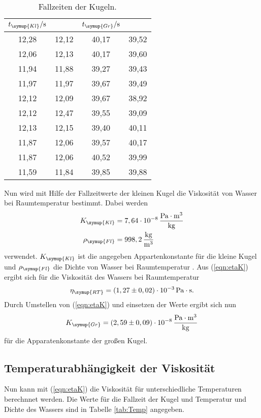 \begin{table}
  \centering
  \caption{Fallzeiten der Kugeln.}
  \label{tab:Fallzeit}
  \begin{tabular}{c c | c c}
    \toprule
    $t_{\symup{Kl}}/\unit{\second} $ & $ $ & $t_{\symup{Gr}}/\unit{\second}$ & $ $ \\
    \midrule
    12,28 & 12,12 & 40,17 & 39,52 \\
    12,06 & 12,13 & 40,17 & 39,60 \\
    11,94 & 11,88 & 39,27 & 39,43 \\
    11,97 & 11,97 & 39,67 & 39,49 \\
    12,12 & 12,09 & 39,67 & 38,92 \\
    12,12 & 12,47 & 39,55 & 39,09 \\
    12,13 & 12,15 & 39,40 & 40,11 \\
    11,87 & 12,06 & 39,57 & 40,17 \\
    11,87 & 12,06 & 40,52 & 39,99 \\
    11,59 & 11,84 & 39,85 & 39,88 \\
    \bottomrule
  \end{tabular}
\end{table}

Nun wird mit Hilfe der Fallzeitwerte der kleinen Kugel die Viskosität von Wasser bei Raumtemperatur bestimmt. Dabei werden
\begin{align*}
  K_{\symup{Kl}} &= 7,64\cdot 10^{-8} \,\frac{\unit{\pascal}\cdot\unit{\meter^3}}{\unit{\kilo\gram}} \\
  \rho_{\symup{Fl}} &= 998,2\,\frac{\unit{\kilo\gram}}{\unit{\meter^3}}
\end{align*}
verwendet. $K_{\symup{Kl}}$ ist die angegeben Appartenkonstante für die kleine Kugel \cite{anleitung107}  und $\rho_{\symup{Fl}}$
die Dichte von Wasser bei Raumtemperatur \cite{waterdensity}. Aus (\ref{eqn:etaK}) ergibt sich für die Viskosität des Wassers bei Raumtemperatur
\begin{align*}
  \eta_{\symup{RT}} = (1,27 \pm 0,02)\cdot 10^{-3} \,\unit{\pascal}\cdot\unit{\second}.
\end{align*}
Durch Umstellen von (\ref{eqn:etaK}) und einsetzen der Werte ergibt sich nun
\begin{align*}
  K_{\symup{Gr}} = (2,59 \pm 0,09)\cdot 10^{-8}\,\frac{\unit{\pascal}\cdot\unit{\meter^3}}{\unit{\kilo\gram}}
\end{align*}
für die Apparatenkonstante der großen Kugel.

\subsection{Temperaturabhängigkeit der Viskosität}
\label{sec:TempVisk}
Nun kann mit (\ref{eqn:etaK}) die Viskosität für unterschiedliche Temperaturen berechnnet werden. Die Werte für die Fallzeit der Kugel und Temperatur und Dichte \cite{waterdensity}
des Wassers sind in Tabelle \ref{tab:Temp} angegeben. 

